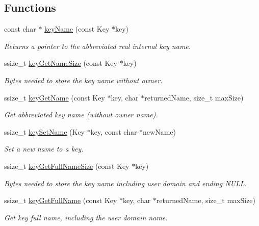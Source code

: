 \subsection*{Functions}
\begin{DoxyCompactItemize}
\item 
const char $\ast$ \hyperlink{group__keyname_ga8e805c726a60da921d3736cda7813513}{key\-Name} (const Key $\ast$key)
\begin{DoxyCompactList}\small\item\em Returns a pointer to the abbreviated real internal {\ttfamily key} name. \end{DoxyCompactList}\item 
ssize\-\_\-t \hyperlink{group__keyname_gabdbcfa51ed8a387e47ead207affa2d2e}{key\-Get\-Name\-Size} (const Key $\ast$key)
\begin{DoxyCompactList}\small\item\em Bytes needed to store the key name without owner. \end{DoxyCompactList}\item 
ssize\-\_\-t \hyperlink{group__keyname_gab29a850168d9b31c9529e90cf9ab68be}{key\-Get\-Name} (const Key $\ast$key, char $\ast$returned\-Name, size\-\_\-t max\-Size)
\begin{DoxyCompactList}\small\item\em Get abbreviated key name (without owner name). \end{DoxyCompactList}\item 
ssize\-\_\-t \hyperlink{group__keyname_ga7699091610e7f3f43d2949514a4b35d9}{key\-Set\-Name} (Key $\ast$key, const char $\ast$new\-Name)
\begin{DoxyCompactList}\small\item\em Set a new name to a key. \end{DoxyCompactList}\item 
ssize\-\_\-t \hyperlink{group__keyname_gab65dc9d43d3ee08d5e936a20ebbddd23}{key\-Get\-Full\-Name\-Size} (const Key $\ast$key)
\begin{DoxyCompactList}\small\item\em Bytes needed to store the key name including user domain and ending N\-U\-L\-L. \end{DoxyCompactList}\item 
ssize\-\_\-t \hyperlink{group__keyname_gaaba1494a5ffc976e0e56c43f4334a23c}{key\-Get\-Full\-Name} (const Key $\ast$key, char $\ast$returned\-Name, size\-\_\-t max\-Size)
\begin{DoxyCompactList}\small\item\em Get key full name, including the user domain name. \end{DoxyCompactList}\item 

\end{DoxyCompactItemize}
